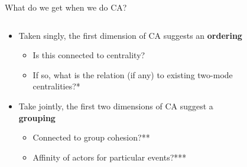 \documentclass[
  ignorenonframetext,
]{beamer}
\providecommand{\tightlist}{%
  \setlength{\itemsep}{0pt}\setlength{\parskip}{0pt}}\usepackage{longtable,booktabs,array}
\begin{document}
\begin{frame}{What do we get when we do CA?}
\protect\hypertarget{what-do-we-get-when-we-do-ca}{}
\begin{columns}[T]
\begin{column}{0.5\textwidth}
\begin{itemize}
\tightlist
\item
  Taken singly, the first dimension of CA suggests an \textbf{ordering}

  \begin{itemize}
  \tightlist
  \item
    Is this connected to centrality?
  \item
    If so, what is the relation (if any) to existing two-mode
    centralities?*
  \end{itemize}
\item
  Take jointly, the first two dimensions of CA suggest a
  \textbf{grouping}

  \begin{itemize}
  \tightlist
  \item
    Connected to group cohesion?**
  \item
    Affinity of actors for particular events?***
  \end{itemize}
\end{itemize}
\end{column}


\begin{column}{0.5\textwidth}
\begin{figure}


\end{figure}
\end{column}
\end{columns}
\end{frame}
\end{document}
